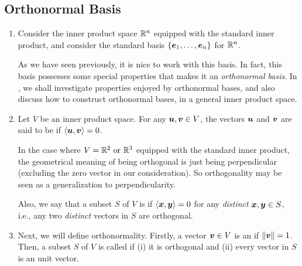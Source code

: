 \subsection{Orthonormal Basis}
\label{subsect:orthonormal-basis}
\begin{enumerate}
\item Consider the inner product space \(\mathbb{R}^n\) equipped with the standard
inner product, and consider the standard basis
\(\{\vb*{e}_1,\dotsc,\vb*{e}_n\}\) for \(\mathbb{R}^n\).

As we have seen previously, it is nice to work with this basis. In fact, this
basis possesses some special properties that makes it an \emph{orthonormal
basis}. In , we shall investigate properties
enjoyed by orthonormal bases, and also discuss how to construct orthonormal
bases, in a general inner product space.

\item Let \(V\) be an inner product space. For any \(\vb*{u},\vb*{v}\in V\),
the vectors \(\vb*{u}\) and \(\vb*{v}\) are said to be  if
\(\left\langle \vb*{u},\vb*{v}\right\rangle=0\).
\begin{note}
In the case where \(V=\mathbb{R}^2\text{ or }\mathbb{R}^3\) equipped with the standard inner
product, the geometrical meaning of being orthogonal is just being
perpendicular (excluding the zero vector in our consideration). So
orthogonality may be seen as a generalization to perpendicularity.
\end{note}

Also, we say that a subset \(S\) of \(V\) is  if
\(\left\langle \vb*{x},\vb*{y}\right\rangle=0\) for any \emph{distinct} \(\vb*{x},\vb*{y}\in
S\), i.e., any two \emph{distinct} vectors in \(S\) are orthogonal.


\item Next, we will define orthonormality. Firstly, a vector \(\vb*{v}\in V\)
is an  if \(\norm{\vb*{v}}=1\). Then, a subset \(S\) of
\(V\) is called  if (i) it is orthogonal and (ii) every
vector in \(S\) is an unit vector.


\end{enumerate}
